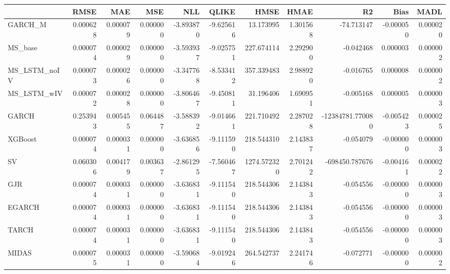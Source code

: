 \begin{tabular}{lrrrrrrrrrr}
\toprule
 & RMSE & MAE & MSE & NLL & QLIKE & HMSE & HMAE & R2 & Bias & MADL \\
\midrule
GARCH_M & 0.000628 & 0.000079 & 0.000000 & -3.893870 & -9.625616 & 13.173995 & 1.301568 & -74.713147 & -0.000050 & 0.000020 \\
MS_base & 0.000074 & 0.000029 & 0.000000 & -3.593937 & -9.025751 & 227.674114 & 2.292900 & -0.042468 & 0.000003 & 0.000002 \\
MS_LSTM_noIV & 0.000073 & 0.000026 & 0.000000 & -3.347768 & -8.533412 & 357.339483 & 2.988920 & -0.016765 & 0.000008 & 0.000002 \\
MS_LSTM_wIV & 0.000072 & 0.000028 & 0.000000 & -3.806467 & -9.450811 & 31.196406 & 1.690951 & -0.005168 & 0.000005 & 0.000003 \\
GARCH & 0.253943 & 0.005455 & 0.064487 & -3.588392 & -9.014661 & 221.710492 & 2.287028 & -12384781.770080 & -0.005423 & 0.000025 \\
XGBoost & 0.000074 & 0.000031 & 0.000000 & -3.636856 & -9.111590 & 218.544310 & 2.143837 & -0.054079 & -0.000000 & 0.000003 \\
SV & 0.060306 & 0.004179 & 0.003637 & -2.861295 & -7.560467 & 1274.572320 & 2.701242 & -698450.787676 & -0.004161 & 0.000022 \\
GJR & 0.000074 & 0.000031 & 0.000000 & -3.636831 & -9.111540 & 218.544306 & 2.143843 & -0.054556 & -0.000000 & 0.000003 \\
EGARCH & 0.000074 & 0.000031 & 0.000000 & -3.636831 & -9.111540 & 218.544306 & 2.143843 & -0.054556 & -0.000000 & 0.000003 \\
TARCH & 0.000074 & 0.000031 & 0.000000 & -3.636831 & -9.111540 & 218.544306 & 2.143843 & -0.054556 & -0.000000 & 0.000003 \\
MIDAS & 0.000075 & 0.000031 & 0.000000 & -3.590684 & -9.019246 & 264.542737 & 2.241746 & -0.072771 & -0.000000 & 0.000002 \\
\bottomrule
\end{tabular}
